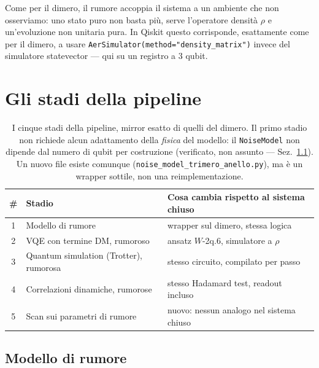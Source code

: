 \documentclass[11pt,a4paper]{article}
\begin{document}
Come per il dimero, il rumore accoppia il sistema a un ambiente che non
osserviamo: uno stato puro non basta più, serve l'operatore densità
$\rho$ e un'evoluzione non unitaria pura. In Qiskit questo corrisponde,
esattamente come per il dimero, a usare
\texttt{AerSimulator(method=\allowbreak"density\_matrix")} invece del
simulatore statevector --- qui su un registro a 3 qubit.

\section{Gli stadi della pipeline}
\label{sec:stadi}

\begin{table}[htbp]
\centering
\begin{tabular}{@{}cll@{}}
\toprule
\# & Stadio & Cosa cambia rispetto al sistema chiuso \\
\midrule
1 & Modello di rumore & wrapper sul dimero, stessa logica \\
2 & VQE con termine DM, rumoroso & ansatz $W$-2q.6, simulatore a $\rho$ \\
3 & Quantum simulation (Trotter), rumorosa & stesso circuito, compilato per passo \\
4 & Correlazioni dinamiche, rumorose & stesso Hadamard test, readout incluso \\
5 & Scan sui parametri di rumore & nuovo: nessun analogo nel sistema chiuso \\
\bottomrule
\end{tabular}
\caption{I cinque stadi della pipeline, mirror esatto di quelli del
dimero. Il primo stadio non richiede alcun adattamento della
\emph{fisica} del modello: il \texttt{NoiseModel} non dipende dal
numero di qubit per costruzione (verificato, non assunto ---
Sez.~\ref{subsec:modello}). Un nuovo file esiste comunque
(\texttt{noise\_model\_\allowbreak trimero\_anello.py}), ma è un
wrapper sottile, non una reimplementazione.}
\end{table}
\FloatBarrier

\subsection{Modello di rumore}
\label{subsec:modello}
\end{document}
